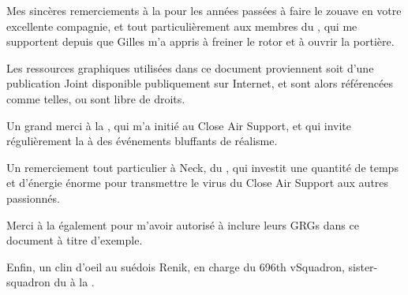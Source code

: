 %

\begin{imini}
Mes sincères remerciements à la \thirdwing{} pour les années passées à faire le zouave en votre excellente compagnie, et tout particulièrement aux membres du \rgt{} \inmem{}, qui me supportent depuis que Gilles m'a appris à freiner le rotor et à ouvrir la portière.

Les ressources graphiques utilisées dans ce document proviennent soit d'une publication Joint disponible publiquement sur Internet, et sont alors référencées comme telles, ou sont libre de droits.

Un grand merci à la \onethreetwo{}, qui m'a initié au Close Air Support, et qui invite régulièrement la \thirdwing{} à des événements bluffants de réalisme.


Un remerciement tout particulier à Neck, du \onethreetwo{}, qui investit une quantité de temps et d'énergie énorme pour transmettre le virus du Close Air Support aux autres passionnés.


Merci à la \onethreetwo{} également pour m'avoir autorisé à inclure leurs GRGs dans ce document à titre d'exemple.


Enfin, un clin d'oeil au suédois Renik, en charge du 696th vSquadron, sister-squadron du \rgt{} à la \onethreetwo{}.
\end{imini}

\vfil